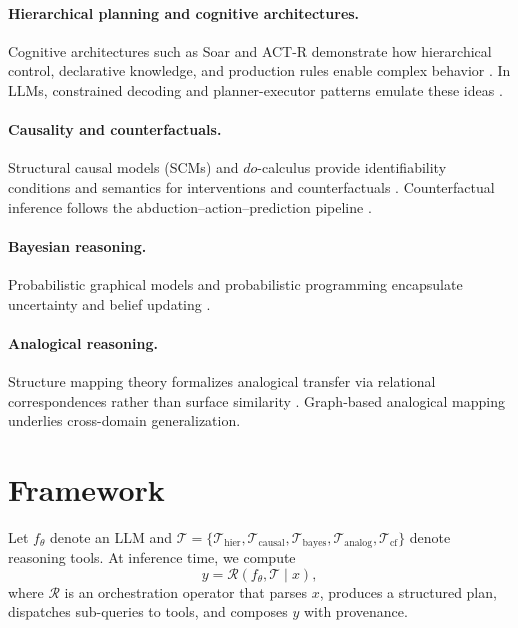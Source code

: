 \documentclass[11pt]{article}
\begin{document}
\paragraph{Hierarchical planning and cognitive architectures.}
Cognitive architectures such as Soar and ACT-R demonstrate how hierarchical control, declarative knowledge, and production rules enable complex behavior \citep{lebiere2009actr,newell1990unified}. In LLMs, constrained decoding and planner-executor patterns emulate these ideas \citep{yao2022react}.
\paragraph{Causality and counterfactuals.}
Structural causal models (SCMs) and $do$-calculus provide identifiability conditions and semantics for interventions and counterfactuals \citep{pearl2009causality, peters2017elements}. Counterfactual inference follows the abduction--action--prediction pipeline \citep{pearl2009causality}.
\paragraph{Bayesian reasoning.}
Probabilistic graphical models and probabilistic programming encapsulate uncertainty and belief updating \citep{gelman2013bayesian, koller2009pgm}.
\paragraph{Analogical reasoning.}
Structure mapping theory formalizes analogical transfer via relational correspondences rather than surface similarity \citep{gentner1983structure, falkenhainer1989structure}. Graph-based analogical mapping underlies cross-domain generalization.

\section{Framework}
Let $f_\theta$ denote an LLM and $\mathcal{T}=\{\mathcal{T}_\mathrm{hier},\mathcal{T}_\mathrm{causal},\mathcal{T}_\mathrm{bayes},\mathcal{T}_\mathrm{analog},\mathcal{T}_\mathrm{cf}\}$ denote reasoning tools.
At inference time, we compute
\begin{equation}
y = \mathcal{R}\!\left(f_\theta, \mathcal{T} \mid x\right),
\end{equation}
where $\mathcal{R}$ is an orchestration operator that parses $x$, produces a structured plan, dispatches sub-queries to tools, and composes $y$ with provenance.
\end{document}
